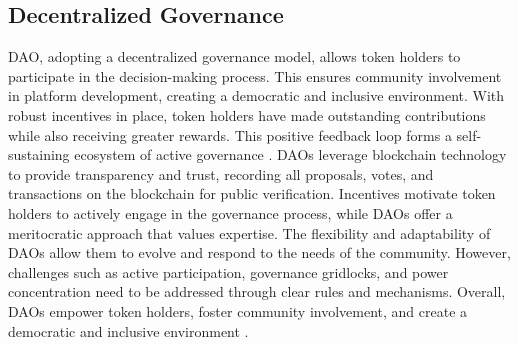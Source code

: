 \documentclass[lettersize,journal]{IEEEtran}
\begin{document}
\subsection{Decentralized Governance}






DAO, adopting a decentralized governance model, allows token holders to participate in the decision-making process. This ensures community involvement in platform development, creating a democratic and inclusive environment. With robust incentives in place, token holders have made outstanding contributions while also receiving greater rewards. This positive feedback loop forms a self-sustaining ecosystem of active governance \cite{beck2018governance}. DAOs leverage blockchain technology to provide transparency and trust, recording all proposals, votes, and transactions on the blockchain for public verification. Incentives motivate token holders to actively engage in the governance process, while DAOs offer a meritocratic approach that values expertise. The flexibility and adaptability of DAOs allow them to evolve and respond to the needs of the community. However, challenges such as active participation, governance gridlocks, and power concentration need to be addressed through clear rules and mechanisms. Overall, DAOs empower token holders, foster community involvement, and create a democratic and inclusive environment \cite{jensen2019theory}.
\end{document}
